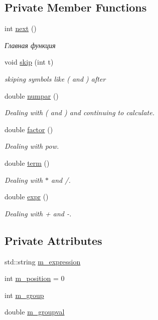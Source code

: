 \subsection*{Private Member Functions}
\begin{DoxyCompactItemize}
\item 
int \hyperlink{class_calculator_class_aaf44bb6d897096a70f657b66b6ae5b0e}{next} ()
\begin{DoxyCompactList}\small\item\em Главная функция \end{DoxyCompactList}\item 
void \hyperlink{class_calculator_class_a5f90ae6f846a004d51d9eacec3340370}{skip} (int t)
\begin{DoxyCompactList}\small\item\em skiping symbols like ( and ) after \end{DoxyCompactList}\item 
double \hyperlink{class_calculator_class_adf79d91e70a4c7218dadf3814e518ad5}{numpar} ()
\begin{DoxyCompactList}\small\item\em Dealing with ( and ) and continuing to calculate. \end{DoxyCompactList}\item 
double \hyperlink{class_calculator_class_a62e618b9d78a224ec8651b7bc1b63aaa}{factor} ()
\begin{DoxyCompactList}\small\item\em Dealing with pow. \end{DoxyCompactList}\item 
double \hyperlink{class_calculator_class_ad61dfc91b354cc8c9dc45c8ee47a11d5}{term} ()
\begin{DoxyCompactList}\small\item\em Dealing with $\ast$ and /. \end{DoxyCompactList}\item 
double \hyperlink{class_calculator_class_aed5fb4ee064e28ef02c806de466b3008}{expr} ()
\begin{DoxyCompactList}\small\item\em Dealing with + and -\/. \end{DoxyCompactList}\end{DoxyCompactItemize}
\subsection*{Private Attributes}
\begin{DoxyCompactItemize}
\item 
std\+::string \hyperlink{class_calculator_class_aac8875c105e259165e83fe627221cfcd}{m\+\_\+expression}
\item 
int \hyperlink{class_calculator_class_a06e41f94f4b3c9f6452ea34041100adf}{m\+\_\+position} = 0
\item 
int \hyperlink{class_calculator_class_aaf297978d3d340d012e118c39671ee3d}{m\+\_\+group}
\item 
double \hyperlink{class_calculator_class_af0634375d7137106773bc6a06a69ae49}{m\+\_\+groupval}
\end{DoxyCompactItemize}


